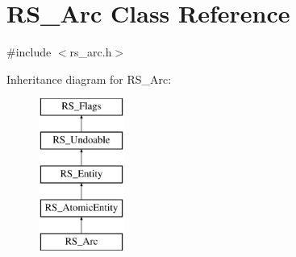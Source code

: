 \hypertarget{classRS__Arc}{\section{R\-S\-\_\-\-Arc Class Reference}
\label{classRS__Arc}
}


{\ttfamily \#include $<$rs\-\_\-arc.\-h$>$}

Inheritance diagram for R\-S\-\_\-\-Arc\-:\begin{figure}[H]
\begin{center}
\leavevmode
\includegraphics[height=5.000000cm]{classRS__Arc}
\end{center}
\end{figure}
